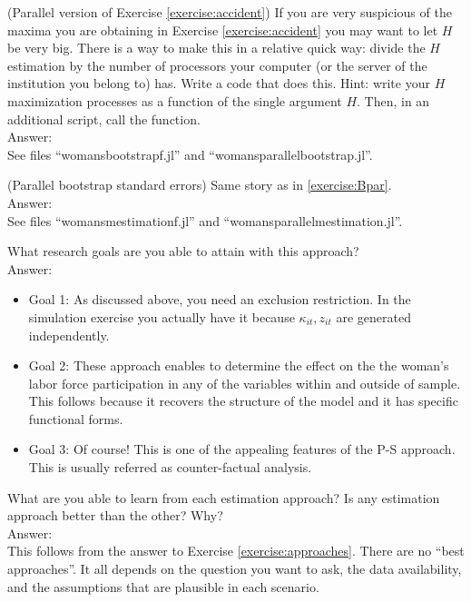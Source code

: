 \begin{exercise} (Parallel version of Exercise \ref{exercise:accident}) \label{exercise:Hpar}
If you are very suspicious of the maxima you are obtaining in Exercise \ref{exercise:accident} you may want to let $H$ be very big. There is a way to make this in a relative quick way: divide the $H$ estimation by the number of processors your computer (or the server of the institution you belong to) has. Write a code that does this. Hint: write your $H$ maximization processes as a function of the single argument $H$. Then, in an additional script, call the function.\\
\noindent Answer: \\
\noindent See files ``womansbootstrapf.jl'' and ``womansparallelbootstrap.jl''.
\end{exercise}

\begin{exercise} (Parallel bootstrap standard errors) \label{exercise:Bpar}
Same story as in \ref{exercise:Bpar}.\\
\noindent Answer: \\
\noindent See files ``womansmestimationf.jl'' and ``womansparallelmestimation.jl''.
\end{exercise}

\begin{exercise} \label{exercise:psapproach}
What research goals are you able to attain with this approach?\\
\noindent Answer:\\
\begin{itemize}
\item Goal 1: As discussed above, you need an exclusion restriction. In the simulation exercise you actually have it because $\kappa_{it},z_{it}$ are generated independently.
\item Goal 2: These approach enables to determine the effect on the the woman's labor force participation in any of the variables within and outside of sample. This follows because it recovers the structure of the model and it has specific functional forms. 
\item Goal 3: Of course! This is one of the appealing features of the P-S approach. This is usually referred as counter-factual analysis. 
\end{itemize}
 
\end{exercise}

\begin{exercise}
What are you able to learn from each estimation approach? Is any estimation approach better than the other? Why?\\
\noindent Answer:\\
\noindent This follows from the answer to Exercise \ref{exercise:approaches}. There are no ``best approaches''. It all depends on the question you want to ask, the data availability, and the assumptions that are plausible in each scenario.
\end{exercise}